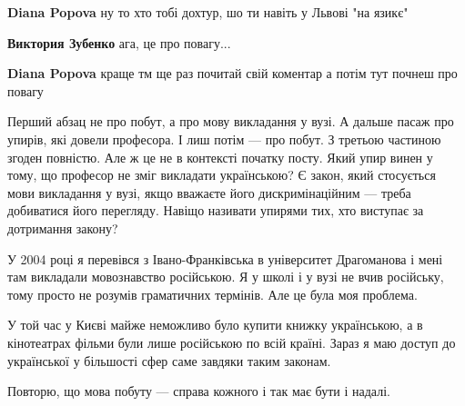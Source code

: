 \begin{itemize}
\begin{itemize}
 
\textbf{Diana Popova} ну то хто тобі дохтур, шо ти навіть у Львові "на язикє"

 

\textbf{Виктория Зубенко} ага, це про повагу...

 
\textbf{Diana Popova} краще тм ще раз почитай свій коментар а потім тут почнеш про повагу
\end{itemize}

 

Перший абзац не про побут, а про мову викладання у вузі. А дальше пасаж про
упирів, які довели професора. І лиш потім — про побут. З третьою частиною
згоден повністю. Але ж це не в контексті початку посту. Який упир винен у тому,
що професор не зміг викладати українською? Є закон, який стосується мови
викладання у вузі, якщо вважаєте його дискримінаційним — треба добиватися його
перегляду. Навіщо називати упирями тих, хто виступає за дотримання закону?

У 2004 році я перевівся з Івано-Франківська в університет Драгоманова і мені
там викладали мовознавство російською. Я у школі і у вузі не вчив російську,
тому просто не розумів граматичних термінів. Але це була моя проблема.

У той час у Києві майже неможливо було купити книжку українською, а в
кінотеатрах фільми були лише російською по всій країні. Зараз я маю доступ до
української у більшості сфер саме завдяки таким законам.

Повторю, що мова побуту — справа кожного і так має бути і надалі.


\end{itemize}
